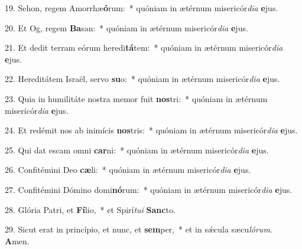 19. Sehon, regem Amorrhæ\textbf{ó}rum:~*  quóniam in ætérnum misericór\textit{di}\textit{a} \textbf{e}jus.\

20. Et Og, regem \textbf{Ba}san:~*  quóniam in ætérnum misericór\textit{di}\textit{a} \textbf{e}jus.\

21. Et dedit terram eórum heredi\textbf{tá}tem:~*  quóniam in ætérnum misericór\textit{di}\textit{a} \textbf{e}jus.\

22. Hereditátem Israël, servo \textbf{su}o:~*  quóniam in ætérnum misericór\textit{di}\textit{a} \textbf{e}jus.\

23. Quia in humilitáte nostra memor fuit \textbf{nos}tri:~*  quóniam in ætérnum misericór\textit{di}\textit{a} \textbf{e}jus.\

24. Et redémit nos ab inimícis \textbf{nos}tris:~*  quóniam in ætérnum misericór\textit{di}\textit{a} \textbf{e}jus.\

25. Qui dat escam omni \textbf{car}ni:~*  quóniam in ætérnum misericór\textit{di}\textit{a} \textbf{e}jus.\

26. Confitémini Deo \textbf{cæ}li:~*  quóniam in ætérnum misericór\textit{di}\textit{a} \textbf{e}jus.\

27. Confitémini Dómino domi\textbf{nó}rum:~*  quóniam in ætérnum misericór\textit{di}\textit{a} \textbf{e}jus.\

28. Glória Patri, et \textbf{Fí}lio,~*  et Spirí\textit{tu}\textit{i} \textbf{Sanc}to.\

29. Sicut erat in princípio, et nunc, et \textbf{sem}per,~*  et in sǽcula sæcu\textit{ló}\textit{rum}. \textbf{A}men.\

